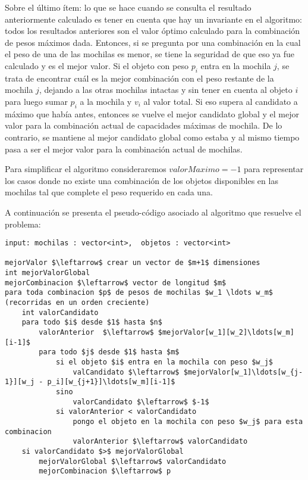 Sobre el último ítem: lo que se hace cuando se consulta el resultado anteriormente calculado es tener en cuenta que hay un invariante en el algoritmo: todos los resultados anteriores son el valor óptimo calculado para la combinación de pesos máximos dada. Entonces, si se pregunta por una combinación en la cual el peso de una de las mochilas es menor, se tiene la seguridad de que eso ya fue calculado y es el mejor valor. Si el objeto con peso $p_i$ entra en la mochila $j$, se trata de encontrar cuál es la mejor combinación con el peso restante de la mochila $j$, dejando a las otras mochilas intactas y sin tener en cuenta al objeto $i$ para luego sumar $p_i$ a la mochila y $v_i$ al valor total. Si eso supera al candidato a máximo que había antes, entonces se vuelve el mejor candidato global y el mejor valor para la combinación actual de capacidades máximas de mochila. De lo contrario, se mantiene al mejor candidato global como estaba y al mismo tiempo pasa a ser el mejor valor para la combinación actual de mochilas.

Para simplificar el algoritmo consideraremos $valorMaximo = -1$ para representar los casos donde no existe una combinación de los objetos disponibles en las mochilas tal que complete el peso requerido en cada una.

A continuación se presenta el pseudo-código asociado al algoritmo que resuelve el problema:

\newpage

\begin{lstlisting}
input: mochilas : vector<int>,  objetos : vector<int>

mejorValor $\leftarrow$ crear un vector de $m+1$ dimensiones
int mejorValorGlobal
mejorCombinacion $\leftarrow$ vector de longitud $m$
para toda combinacion $p$ de pesos de mochilas $w_1 \ldots w_m$ (recorridas en un orden creciente)
	int valorCandidato
	para todo $i$ desde $1$ hasta $n$
		valorAnterior  $\leftarrow$ $mejorValor[w_1][w_2]\ldots[w_m][i-1]$
		para todo $j$ desde $1$ hasta $m$
			si el objeto $i$ entra en la mochila con peso $w_j$
				valCandidato $\leftarrow$ $mejorValor[w_1]\ldots[w_{j-1}][w_j - p_i][w_{j+1}]\ldots[w_m][i-1]$
			sino
				valorCandidato $\leftarrow$ $-1$
			si valorAnterior < valorCandidato
				pongo el objeto en la mochila con peso $w_j$ para esta combinacion
				valorAnterior $\leftarrow$ valorCandidato
	si valorCandidato $>$ mejorValorGlobal
		mejorValorGlobal $\leftarrow$ valorCandidato
		mejorCombinacion $\leftarrow$ p

\end{lstlisting}

